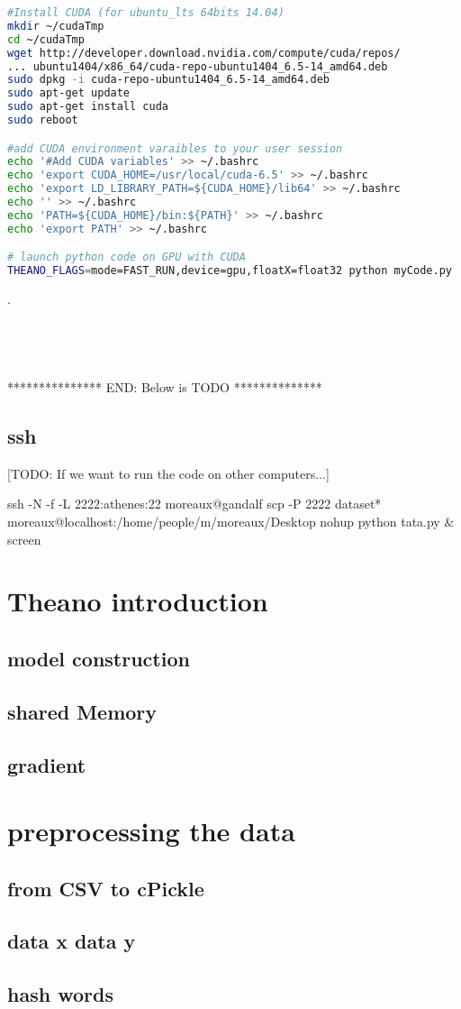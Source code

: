 		\begin{lstlisting}[language=bash]
#Install CUDA (for ubuntu_lts 64bits 14.04)
mkdir ~/cudaTmp
cd ~/cudaTmp
wget http://developer.download.nvidia.com/compute/cuda/repos/
... ubuntu1404/x86_64/cuda-repo-ubuntu1404_6.5-14_amd64.deb
sudo dpkg -i cuda-repo-ubuntu1404_6.5-14_amd64.deb
sudo apt-get update
sudo apt-get install cuda
sudo reboot

#add CUDA environment varaibles to your user session
echo '#Add CUDA variables' >> ~/.bashrc
echo 'export CUDA_HOME=/usr/local/cuda-6.5' >> ~/.bashrc
echo 'export LD_LIBRARY_PATH=${CUDA_HOME}/lib64' >> ~/.bashrc
echo '' >> ~/.bashrc
echo 'PATH=${CUDA_HOME}/bin:${PATH}' >> ~/.bashrc
echo 'export PATH' >> ~/.bashrc

# launch python code on GPU with CUDA
THEANO_FLAGS=mode=FAST_RUN,device=gpu,floatX=float32 python myCode.py
		\end{lstlisting}



.\\ \\ \\ \\ \\
*************** END: Below is TODO ************** 
 

	\subsection{ssh}
		[TODO: If we want to run the code on other computers...]

		ssh -N -f -L 2222:athenes:22 moreaux@gandalf 
		scp -P 2222 dataset* moreaux@localhost:/home/people/m/moreaux/Desktop
		nohup python tata.py \&
		screen
		



\section{Theano introduction}
			
	\subsection{model construction}
	\subsection{shared Memory}
	\subsection{gradient}

\section{preprocessing the data}
	\subsection{from CSV to cPickle}
	\subsection{data x data y}
	\subsection{hash words}






